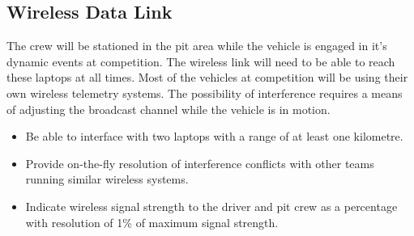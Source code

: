 \subsection{Wireless Data Link}

The crew will be stationed in the pit area while the vehicle is engaged in it's dynamic events at competition. The wireless link will need to be able to reach these laptops at all times. Most of the vehicles at competition will be using their own wireless telemetry systems. The possibility of interference requires a means of adjusting the broadcast channel while the vehicle is in motion. 

\begin{itemize}

\item Be able to interface with two laptops with a range of at least one kilometre.
\item Provide on-the-fly resolution of interference conflicts with other teams running similar wireless systems.
\item Indicate wireless signal strength to the driver and pit crew as a percentage with resolution of 1\% of maximum signal
strength. 

\end{itemize}
